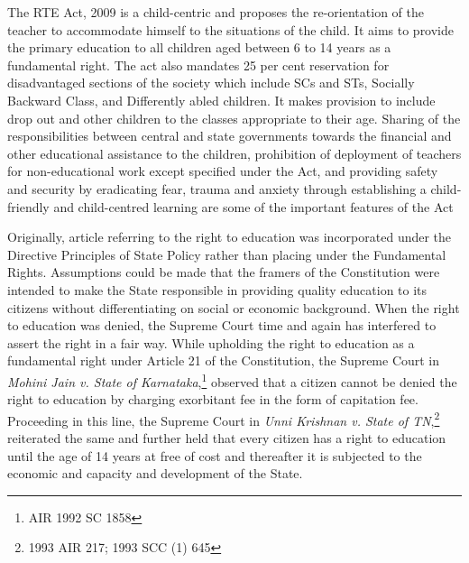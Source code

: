 \begin{multicols}{2}
\noi
The RTE Act, 2009 is a child-centric and proposes the re-orientation of the teacher to
accommodate himself to the situations of the child. It aims to provide the primary education
to all children aged between 6 to 14 years as a fundamental right. The act also mandates 25
per cent reservation for disadvantaged sections of the society which include SCs and STs,
Socially Backward Class, and Differently abled children. It makes provision to include drop
out and other children to the classes appropriate to their age. Sharing of the responsibilities
between central and state governments towards the financial and other educational assistance
to the children, prohibition of deployment of teachers for non-educational work except
specified under the Act, and providing safety and security by eradicating fear, trauma and
anxiety through establishing a child-friendly and child-centred learning are some of the
important features of the Act


\noi
Originally, article referring to the right to education was incorporated under the Directive
Principles of State Policy rather than placing under the Fundamental Rights. Assumptions
could be made that the framers of the Constitution were intended to make the State
responsible in providing quality education to its citizens without differentiating on social or
economic background. When the right to education was denied, the Supreme Court time and
again has interfered to assert the right in a fair way. While upholding the right to education as
a fundamental right under Article 21 of the Constitution, the Supreme Court in \textit{Mohini Jain v. State of Karnataka},\footnote{AIR 1992 SC 1858} observed that a citizen cannot be denied the right to education by
charging exorbitant fee in the form of capitation fee. Proceeding in this line, the Supreme
Court in \textit{Unni Krishnan v. State of TN},\footnote{1993 AIR 217; 1993 SCC (1) 645} reiterated the same and further held that every
citizen has a right to education until the age of 14 years at free of cost and thereafter it is
subjected to the economic and capacity and development of the State.


\end{multicols}
